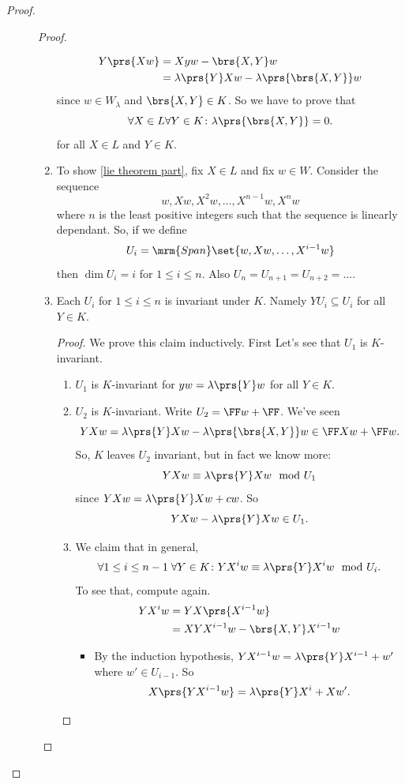 \documentclass[10pt,a4paper,twoside,openany,hidelinks]{book}
\begin{document}
\begin{proof}
\begin{description}
\begin{proof}
\begin{enumerate}[label = \Roman*)]
\begin{align*}
Y\prs{Xw} &= Xyw - \brs{X,Y}w \\
&= \lambda\prs{Y} Xw - \lambda\prs{\brs{X,Y}}w
\end{align*}
since $w \in W_{\lambda}$ and $\brs{X,Y} \in K$.
So we have to prove that
\begin{equation} \label{lie theorem part}
\forall X \in L \forall Y \in K \colon \lambda\prs{\brs{X,Y}} = 0 \text{.}
\end{equation}
for all $X \in L$ and $Y \in K$.
\item To show \eqref{lie theorem part}, fix $X \in L$ and fix $w \in W$. Consider the sequence \[w, Xw, X^2w, \ldots, X^{n-1}w, X^nw\]
where $n$ is the least positive integers such that the sequence is linearly dependant.
So, if we define \[U_i = \mrm{Span}\set{w, Xw, \ldots, X^{i-1}w}\] then $\dim U_i = i$ for $1 \leq i \leq n$. Also $U_n = U_{n+1} =  U_{n+2} = \ldots$.
\item
\begin{claim}
Each $U_i$ for $1 \leq i \leq n$ is invariant under $K$. Namely $Y U_i \subseteq U_i$ for all $Y \in K$.
\end{claim}
\begin{proof}
We prove this claim inductively. First Let's see that $U_1$ is $K$-invariant.
\begin{enumerate}[label = (\roman*)]
\item $U_1$ is $K$-invariant for $yw = \lambda\prs{Y} w$ for all $Y \in K$.
\item $U_2$ is $K$-invariant. Write $U_2 = \FF w + \FF$. We've seen
\[YXw = \lambda\prs{Y}Xw - \lambda\prs{\brs{X,Y}}w \in \FF Xw + \FF w\text{.}\]
So, $K$ leaves $U_2$ invariant, but in fact we know more:
\[YXw \equiv \lambda\prs{Y} Xw \mod{U_1}\]
since $YXw = \lambda\prs{Y} Xw + cw$. So
\[YXw - \lambda\prs{Y}Xw \in U_1\text{.}\]
\item We claim that in general, \begin{equation}\label{star}\forall 1 \leq i \leq n-1 \; \forall Y \in K \colon Y X^i w \equiv \lambda\prs{Y} X^i w \mod{U_i}\text{.}\end{equation}
To see that, compute again.
\begin{align*}
YX^i w &= YX\prs{X^{i-1}w} \\ &= XYX^{i-1}w - \brs{X,Y} X^{i-1} w 
\end{align*}
\begin{itemize}
\item
By the induction hypothesis, $YX^{i-1}w = \lambda\prs{Y} X^{i-1} + w'$ where $w' \in U_{i-1}$. So \[X\prs{YX^{i-1}w} = \lambda\prs{Y}X^{i} + Xw'\text{.}\]

\end{itemize}
\end{enumerate}
\end{proof}
\end{enumerate}
\end{proof}
\end{description}
\end{proof}
\end{document}
